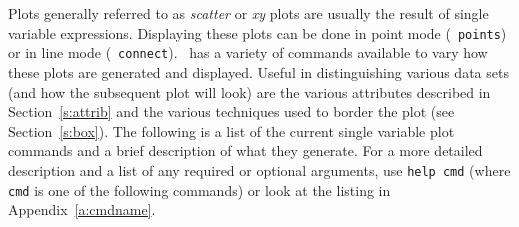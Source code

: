 Plots generally referred to as {\em scatter} or {\em xy} plots are
usually the result of single variable expressions.
Displaying these plots can be done in point mode
(\eg\ {\tt points}) or in line mode
(\eg\ {\tt connect}).
\wip\ has a variety of commands available to vary how these plots are
generated and displayed.
Useful in distinguishing various data sets (and how the subsequent
plot will look) are the various
attributes described in Section~\ref{s:attrib}
and the various techniques used to border the plot (see
Section~\ref{s:box}).
The following is a list of the current single variable plot
commands and a brief description
of what they generate.
For a more detailed description and a list of any required or optional
arguments, use
{\tt help cmd} (where {\tt cmd} is one of
the following commands) or look at the listing in Appendix~\ref{a:cmdname}.


